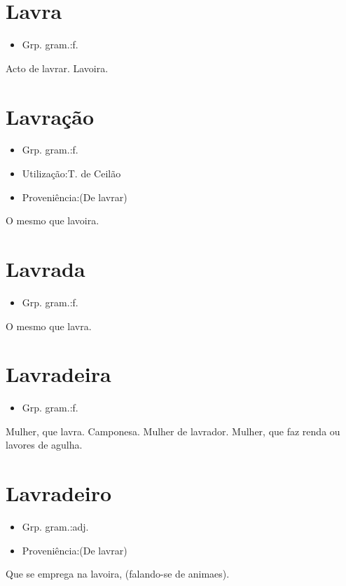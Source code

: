 \section{Lavra}
\begin{itemize}
\item {Grp. gram.:f.}
\end{itemize}
Acto de lavrar.
Lavoira.
\section{Lavração}
\begin{itemize}
\item {Grp. gram.:f.}
\end{itemize}
\begin{itemize}
\item {Utilização:T. de Ceilão}
\end{itemize}
\begin{itemize}
\item {Proveniência:(De \textunderscore lavrar\textunderscore )}
\end{itemize}
O mesmo que \textunderscore lavoira\textunderscore .
\section{Lavrada}
\begin{itemize}
\item {Grp. gram.:f.}
\end{itemize}
O mesmo que \textunderscore lavra\textunderscore .
\section{Lavradeira}
\begin{itemize}
\item {Grp. gram.:f.}
\end{itemize}
Mulher, que lavra.
Camponesa.
Mulher de lavrador.
Mulher, que faz renda ou lavores de agulha.
\section{Lavradeiro}
\begin{itemize}
\item {Grp. gram.:adj.}
\end{itemize}
\begin{itemize}
\item {Proveniência:(De \textunderscore lavrar\textunderscore )}
\end{itemize}
Que se emprega na lavoira, (falando-se de animaes).
